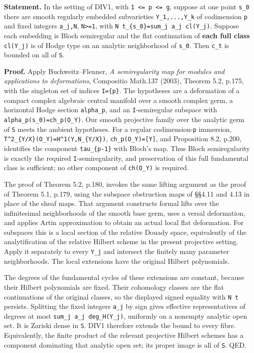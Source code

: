 \documentclass[11pt,a4paper]{article}
\theoremstyle{definition}
\begin{document}
\textbf{Statement.} In the setting of DIV1, with
\texttt{1\ \textless{}=\ p\ \textless{}=\ g}, suppose at one point
\texttt{s\_0} there are smooth regularly embedded subvarieties
\texttt{Y\_1,...,Y\_k} of codimension \texttt{p} and fixed integers
\texttt{a\_j,N}, \texttt{N\textgreater{}=1}, with
\texttt{N\ t\_\{s\_0\}=sum\_j\ a\_j\ cl(Y\_j)}. Suppose each embedding
is Bloch semiregular and the flat continuation of \textbf{each full
class} \texttt{cl(Y\_j)} is of Hodge type on an analytic neighborhood of
\texttt{s\_0}. Then \texttt{c\_t} is bounded on all of \texttt{S}.

\textbf{Proof.} Apply Buchweitz--Flenner, \emph{A semiregularity map for
modules and applications to deformations}, Compositio Math.137 (2003),
Theorem 5.2, p.175, with the singleton set of indices \texttt{I=\{p\}}.
The hypotheses are a deformation of a compact complex algebraic central
manifold over a smooth complex germ, a horizontal Hodge section
\texttt{alpha\_p}, and an \texttt{I}-semiregular subspace with
\texttt{alpha\_p(s\_0)=ch\_p(O\_Y)}. Our smooth projective family over
the analytic germ of \texttt{S} meets the ambient hypotheses. For a
regular codimension-\texttt{p} immersion,
\texttt{T\^{}2\_\{Y/X\}(O\_Y)=H\^{}1(Y,N\_\{Y/X\})},
\texttt{ch\_p(O\_Y)={[}Y{]}}, and Proposition 8.2, p.200, identifies the
component \texttt{tau\_\{p-1\}} with Bloch's map. Thus Bloch
semiregularity is exactly the required \texttt{I}-semiregularity, and
preservation of this full fundamental class is sufficient; no other
component of \texttt{ch(O\_Y)} is required.

The proof of Theorem 5.2, p.180, invokes the same lifting argument as
the proof of Theorem 5.1, p.179, using the subspace obstruction maps of
§§4.11 and 4.13 in place of the sheaf maps. That argument constructs
formal lifts over the infinitesimal neighborhoods of the smooth base
germ, uses a versal deformation, and applies Artin approximation to
obtain an actual local flat deformation. For subspaces this is a local
section of the relative Douady space, equivalently of the
analytification of the relative Hilbert scheme in the present projective
setting. Apply it separately to every \texttt{Y\_j} and intersect the
finitely many parameter neighborhoods. The local extensions have the
original Hilbert polynomials.

The degrees of the fundamental cycles of these extensions are constant,
because their Hilbert polynomials are fixed. Their cohomology classes
are the flat continuations of the original classes, so the displayed
signed equality with \texttt{N\ t} persists. Splitting the fixed
integers \texttt{a\_j} by sign gives effective representatives of
degrees at most \texttt{sum\_j\ \textbar{}a\_j\textbar{}\ deg\_H(Y\_j)},
uniformly on a nonempty analytic open set. It is Zariski dense in
\texttt{S}. DIV1 therefore extends the bound to every fibre.
Equivalently, the finite product of the relevant projective Hilbert
schemes has a component dominating that analytic open set; its proper
image is all of \texttt{S}. QED.
\end{document}
